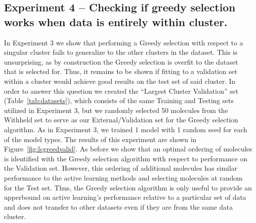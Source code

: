 \documentclass[journal=jmcmar,manuscript=article]{achemso}
\begin{document}
\subsection{Experiment 4 -- Checking if greedy selection works when data is entirely within cluster.}

In Experiment 3 we show that performing a Greedy selection with respect to a singular cluster fails to generalize to the other clusters in the dataset. This is unsurprising, as by construction the Greedy selection is overfit to the dataset that is selected for. Thus, it remains to be shown if fitting to a validation set within a cluster would achieve good results on the test set of said cluster. In order to answer this question we created the ``Largest Cluster Validation'' set (Table~\ref{tab:datasets}), which consists of the same Training and Testing sets utilized in Experiment 3, but we randomly selected 50 molecules from the Withheld set to serve as our External/Validation set for the Greedy selection algorithm. As in Experiment 3, we trained 1 model with 1 random seed for each of the model types. The results of this experiment are shown in Figure~\ref{fig:lcgreedvalid}. As before we show that an optimal ordering of molecules is identified with the Greedy selection algorithm with respect to performance on the Validation set. However, this ordering of additional molecules has similar performance to the active learning methods and selecting molecules at random for the Test set. Thus, the Greedy selection algorithm is only useful to provide an upperbound on active learning's performance relative to a particular set of data and does not transfer to other datasets even if they are from the same data cluster.
\end{document}
